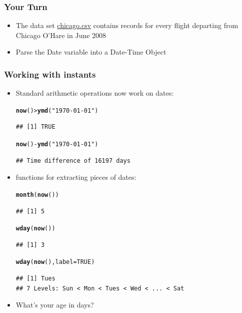 \documentclass{beamer}\usepackage[]{graphicx}\usepackage[]{color}
\makeatletter
\newcommand{\hlnum}[1]{\textcolor[rgb]{0.686,0.059,0.569}{#1}}%
\newcommand{\hlstr}[1]{\textcolor[rgb]{0.192,0.494,0.8}{#1}}%
\newcommand{\hlopt}[1]{\textcolor[rgb]{0,0,0}{#1}}%
\newcommand{\hlstd}[1]{\textcolor[rgb]{0.345,0.345,0.345}{#1}}%
\newcommand{\hlkwc}[1]{\textcolor[rgb]{0.333,0.667,0.333}{#1}}%
\newcommand{\hlkwd}[1]{\textcolor[rgb]{0.737,0.353,0.396}{\textbf{#1}}}%
\newenvironment{kframe}{%
 \def\at@end@of@kframe{}%
 \ifinner\ifhmode%
  \def\at@end@of@kframe{\end{minipage}}%
  \begin{minipage}{\columnwidth}%
 \fi\fi%
 \def\FrameCommand##1{\hskip\@totalleftmargin \hskip-\fboxsep
 \colorbox{shadecolor}{##1}\hskip-\fboxsep
     \hskip-\linewidth \hskip-\@totalleftmargin \hskip\columnwidth}%
 \MakeFramed {\advance\hsize-\width
   \@totalleftmargin\z@ \linewidth\hsize
   \@setminipage}}%
 {\par\unskip\endMakeFramed%
 \at@end@of@kframe}
\newenvironment{knitrout}{}{} %
\makeatother
\begin{document}
\begin{frame}
\frametitle{Your Turn}
\begin{itemize}
\item The data set \href{http://www.hofroe.net/R\%20workshops/02-r-graphics/data/05-data/chicago.csv}{chicago.csv} contains records for every flight departing from Chicago O'Hare in June 2008\medskip
\item Parse the Date variable into a Date-Time Object
\end{itemize}
\end{frame}

\begin{frame}[fragile]
\frametitle{Working with instants}
\begin{itemize}
\item Standard arithmetic operations now work on dates:
\begin{knitrout}\footnotesize
{}\color{fgcolor}\begin{kframe}
\begin{alltt}
\hlkwd{now}\hlstd{()} \hlopt{>} \hlkwd{ymd}\hlstd{(}\hlstr{"1970-01-01"}\hlstd{)}
\end{alltt}
\begin{verbatim}
## [1] TRUE
\end{verbatim}
\begin{alltt}
\hlkwd{now}\hlstd{()} \hlopt{-} \hlkwd{ymd}\hlstd{(}\hlstr{"1970-01-01"}\hlstd{)}
\end{alltt}
\begin{verbatim}
## Time difference of 16197 days
\end{verbatim}
\end{kframe}
\end{knitrout}

\item functions for extracting pieces of dates:
\begin{knitrout}\footnotesize
{}\color{fgcolor}\begin{kframe}
\begin{alltt}
\hlkwd{month}\hlstd{(}\hlkwd{now}\hlstd{())}
\end{alltt}
\begin{verbatim}
## [1] 5
\end{verbatim}
\begin{alltt}
\hlkwd{wday}\hlstd{(}\hlkwd{now}\hlstd{())}
\end{alltt}
\begin{verbatim}
## [1] 3
\end{verbatim}
\begin{alltt}
\hlkwd{wday}\hlstd{(}\hlkwd{now}\hlstd{(),} \hlkwc{label}\hlstd{=}\hlnum{TRUE}\hlstd{)}
\end{alltt}
\begin{verbatim}
## [1] Tues
## 7 Levels: Sun < Mon < Tues < Wed < ... < Sat
\end{verbatim}
\end{kframe}
\end{knitrout}

\item What's your age in days?
\end{itemize}
\end{frame}
\end{document}
